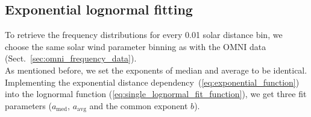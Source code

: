 \subsection{Exponential lognormal fitting}
To retrieve the frequency distributions for every \SI{0.01}{\au} solar distance bin, we choose the same solar wind parameter binning as with the OMNI data (Sect.~\ref{sec:omni_frequency_data}).\\

As mentioned before, we set the exponents of median and average to be identical. Implementing the exponential distance dependency~(\ref{eq:exponential_function}) into the lognormal function (\ref{eq:single_lognormal_fit_function}), we get three fit parameters ($a_\text{med}$, $a_\text{avg}$ and the common exponent $b$).

